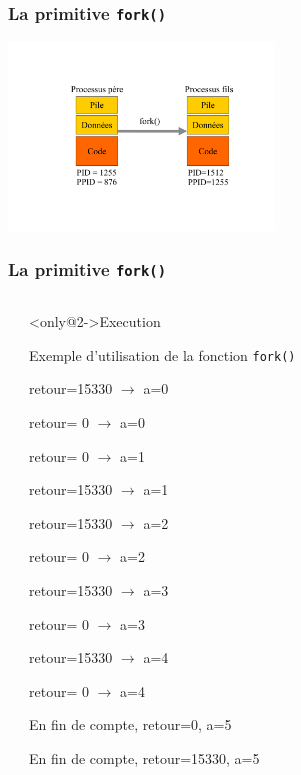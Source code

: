 \begin{frame}
\frametitle{La primitive \texttt{fork()}}
\includegraphics[height=5cm]{../illustration/fork.pdf}
\end{frame}


\begin{frame}
\frametitle{La primitive \texttt{fork()}}
\begin{columns}
\begin{small}

\end{small}
\begin{block}<only@2->{Execution}
\begin{tiny}
Exemple d'utilisation de la fonction \texttt{fork()}

retour=15330 $\rightarrow$ a=0

retour=    0 $\rightarrow$ a=0

retour=    0 $\rightarrow$ a=1

retour=15330 $\rightarrow$ a=1

retour=15330 $\rightarrow$ a=2

retour=    0 $\rightarrow$ a=2

retour=15330 $\rightarrow$ a=3

retour=    0 $\rightarrow$ a=3

retour=15330 $\rightarrow$ a=4

retour=    0 $\rightarrow$ a=4

En fin de compte, retour=0, a=5

En fin de compte, retour=15330, a=5
\end{tiny}
\end{block}
\end{columns}
\end{frame}


